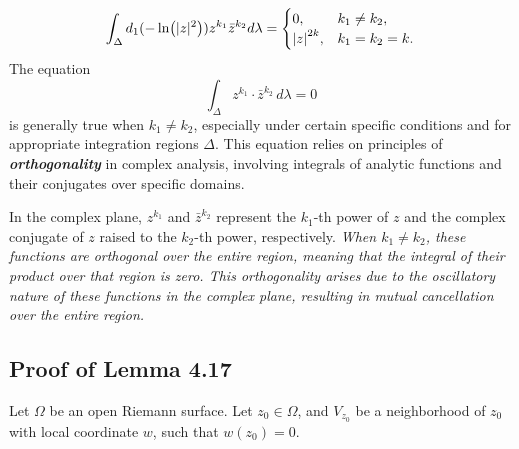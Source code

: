 \documentclass[twoside,openany,12pt]{beautynote}
\newcommand{\itbf}[1]{\textbf{\itshape #1}}\newcommand{\supp}{\operatorname{Supp}}\newcommand{\xu}{\sqrt{-1}}
\begin{document}
\begin{remark}
  \begin{align*}
    \int_{\Delta}d_{1}(-\ln(|z|^{2}))z^{k_{1}}\bar{z}^{k_{2}}d\lambda=\begin{cases}
      0, & k_1\neq k_2,\\ 
      \abs{z}^{2k}, & k_1=k_2=k.
    \end{cases}
  \end{align*}
  The equation $$\int_\Delta z^{k_1}\cdot \bar{z}^{k_2} \, d\lambda = 0$$ is generally true when $k_1 \neq k_2$, especially under certain specific conditions and for appropriate integration regions $\Delta$. This equation relies on principles of \itbf{orthogonality} in complex analysis, involving integrals of analytic functions and their conjugates over specific domains.

  In the complex plane, $z^{k_1}$ and $\bar{z}^{k_2}$ represent the $k_1$-th power of $z$ and the complex conjugate of $z$ raised to the $k_2$-th power, respectively. \emph{When $k_1 \neq k_2$, these functions are orthogonal over the entire region, meaning that the integral of their product over that region is zero. This orthogonality arises due to the oscillatory nature of these functions in the complex plane, resulting in mutual cancellation over the entire region.}
  
  

\end{remark}


\subsection{Proof of Lemma 4.17}

Let $\Omega$ be an open Riemann surface.
Let $z_{0}\in\Omega$,
and $V_{z_0}$ be a neighborhood of $z_{0}$ with local coordinate $w$,
such that $w(z_{0})=0$.
\end{document}
